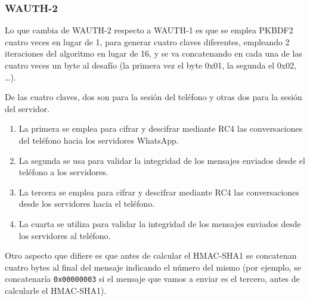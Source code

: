 \documentclass[a4paper, 11pt]{article} %
\begin{document}
      
    \subsubsection{WAUTH-2}
      Lo que cambia de WAUTH-2 respecto a WAUTH-1 es que se emplea PKBDF2 cuatro veces en lugar de 1, para generar cuatro
      claves diferentes, empleando 2 iteraciones del algoritmo en lugar de 16, y se va concatenando en cada una de las
      cuatro veces un byte al desafío (la primera vez el byte 0x01, la segunda el 0x02, \ldots).

      De las cuatro claves, dos son para la sesión del teléfono y otras dos para la sesión del servidor.
      \begin{enumerate}
	\item La primera se emplea para cifrar y descifrar mediante RC4 las conversaciones del teléfono hacia los servidores
	  WhatsApp.
	\item La segunda se usa para validar la integridad de los mensajes enviados desde el teléfono a los servidores.
	\item La tercera se emplea para cifrar y descifrar mediante RC4 las conversaciones desde los servidores hacia el 
	  teléfono.
	\item La cuarta se utiliza para validar la integridad de los mensajes enviados desde los servidores al teléfono.
      \end{enumerate}

      Otro aspecto que difiere es que antes de calcular el HMAC-SHA1 se concatenan cuatro bytes al final del mensaje indicando
      el número del mismo (por ejemplo, se concatenaría \texttt{0x00000003} si el mensaje que vamos a enviar es el tercero, antes
      de calcularle el HMAC-SHA1).
\end{document}
